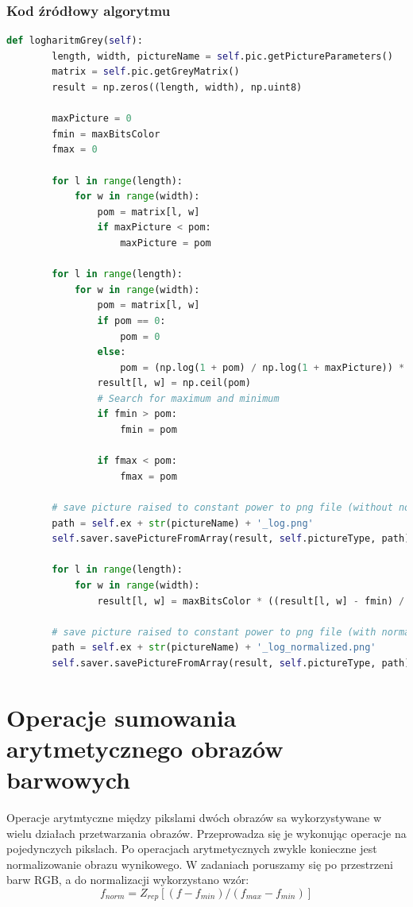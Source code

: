 \documentclass[a4paper,12pt, titlepage]{report}
\begin{document}
\subsection*{Kod źródłowy algorytmu}
\begin{lstlisting}[language=Python]
def logharitmGrey(self):
        length, width, pictureName = self.pic.getPictureParameters()
        matrix = self.pic.getGreyMatrix()
        result = np.zeros((length, width), np.uint8)

        maxPicture = 0
        fmin = maxBitsColor
        fmax = 0

        for l in range(length):
            for w in range(width):
                pom = matrix[l, w]
                if maxPicture < pom:
                    maxPicture = pom

        for l in range(length):
            for w in range(width):
                pom = matrix[l, w]
                if pom == 0:
                    pom = 0
                else:
                    pom = (np.log(1 + pom) / np.log(1 + maxPicture)) * maxBitsColor
                result[l, w] = np.ceil(pom)
                # Search for maximum and minimum
                if fmin > pom:
                    fmin = pom

                if fmax < pom:
                    fmax = pom

        # save picture raised to constant power to png file (without normalization)
        path = self.ex + str(pictureName) + '_log.png'
        self.saver.savePictureFromArray(result, self.pictureType, path)

        for l in range(length):
            for w in range(width):
                result[l, w] = maxBitsColor * ((result[l, w] - fmin) / (fmax - fmin))

        # save picture raised to constant power to png file (with normalization)
        path = self.ex + str(pictureName) + '_log_normalized.png'
        self.saver.savePictureFromArray(result, self.pictureType, path)
\end{lstlisting}

\chapter{Operacje sumowania arytmetycznego obrazów barwowych}
Operacje arytmtyczne między pikslami dwóch obrazów sa wykorzystywane w wielu działach przetwarzania obrazów. Przeprowadza się je wykonując operacje na pojedynczych pikslach. Po operacjach arytmetycznych zwykle konieczne jest normalizowanie obrazu wynikowego. W zadaniach poruszamy się po przestrzeni barw RGB, a do normalizacji wykorzystano wzór:
\[f_{norm}=Z_{rep}[(f-f_{min})/(f_{max}-f_{min})]\]
\end{document}
